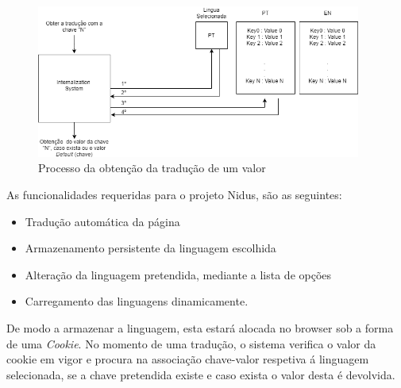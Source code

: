  \begin{figure}[ht]
\centering
\includegraphics[width=0.95\textwidth]{images/i18n.png}
\caption{Processo da obtenção da tradução de um valor}\label{i18n}
\end{figure}

\par As funcionalidades requeridas para o projeto Nidus, são as seguintes:

\begin{itemize}
\item Tradução automática da página
\item Armazenamento persistente da linguagem escolhida
\item Alteração da linguagem pretendida, mediante a lista de opções
\item Carregamento das linguagens dinamicamente.
\end{itemize}	

\par De modo a armazenar a linguagem, esta estará alocada no browser sob a forma de uma \textit{Cookie}. No momento de uma tradução, o sistema verifica o valor da cookie em vigor e procura na associação chave-valor respetiva á linguagem selecionada, se a chave pretendida existe e caso exista o valor desta é devolvida.

